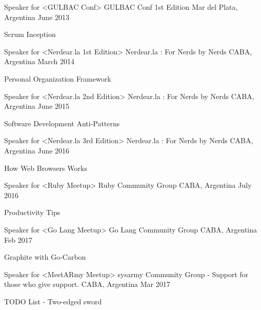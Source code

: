 
\begin{cventries}

  \cventry
    {Speaker for <GULBAC Conf>}
    {GULBAC Conf 1st Edition}
    {Mar del Plata, Argentina}
    {June 2013}
    {
      \begin{cvitems}
        \item {Scrum Inception}
      \end{cvitems}
    }

  \cventry
    {Speaker for <Nerdear.la 1st Edition>}
    {Nerdear.la : For Nerds by Nerds}
    {CABA, Argentina}
    {March 2014}
    {
      \begin{cvitems}
        \item {Personal Organization Framework}
      \end{cvitems}
    }

  \cventry
    {Speaker for <Nerdear.la 2nd Edition>}
    {Nerdear.la : For Nerds by Nerds}
    {CABA, Argentina}
    {June 2015}
    {
      \begin{cvitems}
        \item {Software Development Anti-Patterns}
      \end{cvitems}
    }


  \cventry
    {Speaker for <Nerdear.la 3rd Edition>}
    {Nerdear.la : For Nerds by Nerds}
    {CABA, Argentina}
    {June 2016}
    {
      \begin{cvitems}
        \item {How Web Browsers Works}
      \end{cvitems}
    }
    
    
  \cventry
    {Speaker for <Ruby Meetup>}
    {Ruby Community Group}
    {CABA, Argentina}
    {July 2016}
    {
      \begin{cvitems}
        \item {Productivity Tips}
      \end{cvitems}
    }

        
  \cventry
    {Speaker for <Go Lang Meetup>}
    {Go Lang Community Group }
    {CABA, Argentina}
    {Feb 2017}
    {
      \begin{cvitems}
        \item {Graphite with Go-Carbon}
      \end{cvitems}
    }
    
  \cventry
    {Speaker for <MeetARmy Meetup>}
    {sysarmy Community Group - Support for those who give support. }
    {CABA, Argentina}
    {Mar 2017}
    {
      \begin{cvitems}
        \item {TODO List - Two-edged sword}
      \end{cvitems}
    }
    

\end{cventries}

